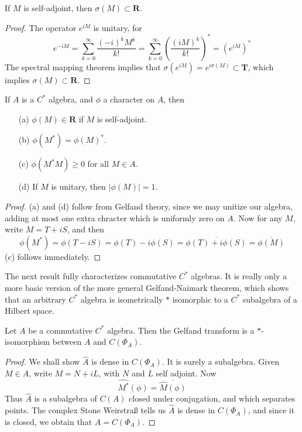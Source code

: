 \begin{prop}
    If $M$ is self-adjoint, then $\sigma(M) \subset \mathbf{R}$.
\end{prop}
\begin{proof}
    The operator $e^{iM}$ is unitary, for
    \[ e^{-iM} = \sum_{k = 0}^\infty \frac{(-i)^k M^k}{k!} = \sum_{k = 0}^\infty \left( \frac{(iM)^k}{k!} \right)^* = (e^{iM})^* \]
    The spectral mapping theorem implies that $\sigma(e^{iM}) = e^{i \sigma(M)} \subset \mathbf{T}$, which implies $\sigma(M) \subset \mathbf{R}$.
\end{proof}

\begin{prop}
    If $A$ is a $C^*$ algebra, and $\phi$ a character on $A$, then
    \begin{enumerate}
        \item[(a)] $\phi(M) \in \mathbf{R}$ if $M$ is self-adjoint.
        \item[(b)] $\phi(M^*) = \phi(M)^*$.
        \item[(c)] $\phi(M^*M) \geq 0$ for all $M \in A$.
        \item[(d)] If $M$ is unitary, then $|\phi(M)| = 1$.
    \end{enumerate}
\end{prop}
\begin{proof}
    (a) and (d) follow from Gelfand theory, since we may unitize our algebra, adding at most one extra chracter which is uniformly zero on $A$. Now for any $M$, write $M = T + iS$, and then
    \[ \phi(M^*) = \phi(T - iS) = \phi(T) - i \phi(S) = \overline{\phi(T) + i \phi(S)} = \overline{\phi(M)} \]
    (c) follows immediately.
\end{proof}

The next result fully characterizes commutative $C^*$ algebras. It is really only a more basic version of the more general Gelfand-Naimark theorem, which shows that an arbitrary $C^*$ algebra is isometrically $*$ isomorphic to a $C^*$ subalgebra of a Hilbert space.

\begin{theorem}
    Let $A$ be a commutative $C^*$ algebra. Then the Gelfand transform is a $*$-isomorphism between $A$ and $C(\Phi_A)$.
\end{theorem}
\begin{proof}
    We shall show $\hat{A}$ is dense in $C(\Phi_A)$. It is surely a subalgebra. Given $M \in A$, write $M = N + iL$, with $N$ and $L$ self adjoint. Now
    \[ \widehat{M^*}(\phi) = \overline{\widehat{M}(\phi)} \]
    Thus $\widehat{A}$ is a subalgebra of $C(A)$ closed under conjugation, and which separates points. The complex Stone Weirstra{\ss} tells us $\widehat{A}$ is dense in $C(\Phi_A)$, and since it is closed, we obtain that $\widehat{A} = C(\Phi_A)$.
\end{proof}

